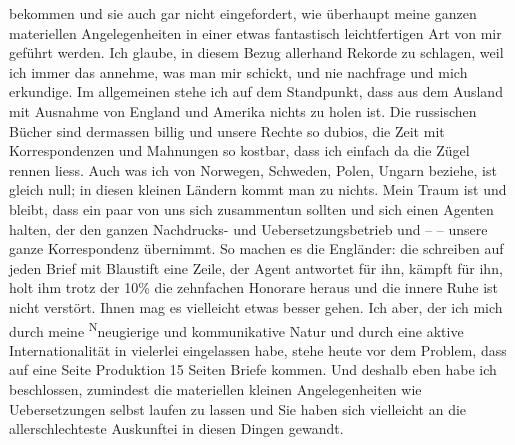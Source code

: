                bekommen und sie auch gar nicht eingefordert, wie überhaupt meine ganzen materiellen
               Angelegenheiten in einer etwas fantastisch leichtfertigen Art von mir geführt werden.
               Ich glaube, \introOben{}in diesem Bezug\introOben{}
               allerhand Rekorde zu schlagen, weil ich immer das annehme, was man mir schickt, und
               nie nachfrage und mich erkundige. Im allgemeinen stehe ich auf dem Standpunkt, dass
               aus dem Ausland mit Ausnahme von England und
                  Amerika nichts zu holen ist. Die russischen Bücher sind dermassen billig und
               unsere Rechte so dubios, die Zeit mit Korrespondenzen und Mahnungen \label{T_L03688-1v}\label{T_L03688-1} so
               kostbar, dass ich einfach da die Zügel rennen liess. Auch was ich von Norwegen, Schweden, Polen, Ungarn beziehe, ist gleich null; in diesen kleinen Ländern
               kommt man zu nichts. Mein Traum ist und bleibt, dass ein paar von uns sich
               zusammentun sollten und sich einen Agenten halten, der den ganzen Nachdrucks- und
               Uebersetzungsbetrieb und – \label{K_L03688-2v}\label{K_L03688-2} – unsere
               ganze Korrespondenz übernimmt. So machen es die Engländer: die schreiben auf jeden Brief mit Blaustift eine Zeile, der Agent
                  antwortet für ihn, kämpft für ihn, holt ihm
               trotz der 10{\%} die zehnfachen Honorare heraus und die innere
               Ruhe ist nicht verstört. Ihnen mag es vielleicht etwas besser gehen. Ich aber, der
               ich mich durch meine \substVorne{}\textsuperscript{N}\substDazwischen{}n\substHinten{}eugierige und kommunikative Natur und durch eine aktive Internationalität {\pb}in vielerlei eingelassen habe, stehe heute
               vor dem Problem, dass auf eine Seite Produktion 15 Seiten Briefe kommen. Und deshalb
               eben habe ich beschlossen, zumindest die materiellen kleinen Angelegenheiten wie
               Uebersetzungen selbst laufen zu lassen und Sie haben sich vielleicht an die
               allerschlechteste Auskunftei in diesen Dingen gewandt.\pend
           
